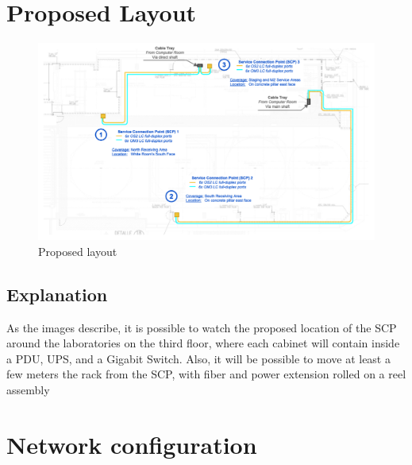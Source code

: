 \newpage
\section{Proposed Layout}

\begin{figure}
  \includegraphics[width=16cm]{images/image-001.png}
  \centering
  \caption{Proposed layout}
\end{figure}

\subsection{Explanation}

As the images describe, it is possible to watch the proposed location of the SCP around the laboratories on the third floor, where each cabinet will contain inside a PDU, UPS, and a Gigabit Switch.
Also, it will be possible to move at least a few meters the rack from the SCP, with fiber and power extension rolled on a reel assembly

\newpage
\section{Network configuration}
